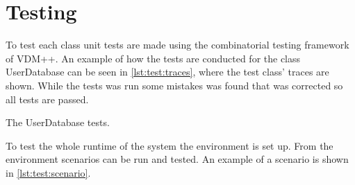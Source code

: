 \chapter{Testing}

To test each class unit tests are made using the combinatorial testing framework of VDM++. An example of how the tests are conducted for the class {\ttfamily UserDatabase} can be seen in \cref{lst:test:traces}, where the test class' traces are shown. While the tests was run some mistakes was found that was corrected so all tests are passed.

\begin{listing}[H]
    \caption{The {\ttfamily UserDatabase} tests.}
    \label{lst:test:traces}
\end{listing}

To test the whole runtime of the system the environment is set up. From the environment scenarios can be run and tested. An example of a scenario is shown in \cref{lst:test:scenario}.


